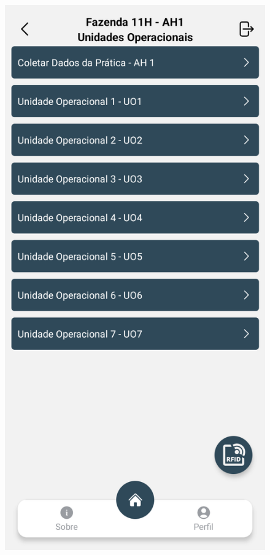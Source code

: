 \begin{figure}[H]
\begin{minipage}[b]{0.30\textwidth}
    \end{minipage}
    \hspace{3pt}
    \begin{minipage}[b]{0.30\textwidth}
        \centering
        \includegraphics[width=\textwidth]{images/app/05-operational-units.png}

\end{minipage}
\end{figure}
